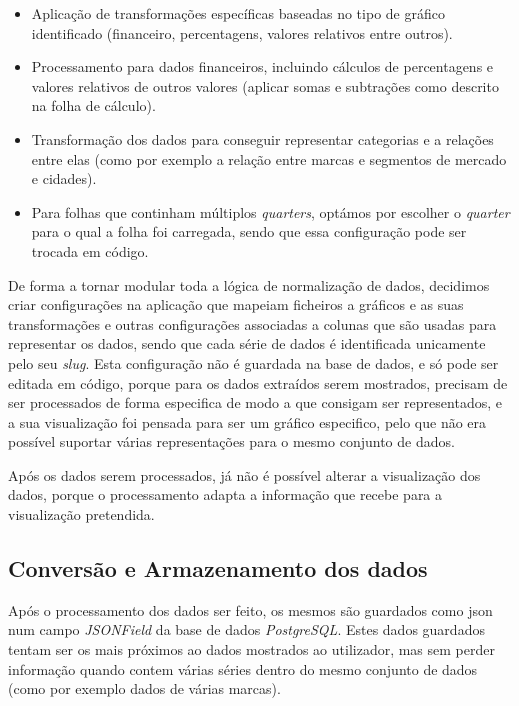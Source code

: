\begin{itemize}
    \item Aplicação de transformações específicas baseadas no tipo de gráfico identificado (financeiro, percentagens, valores relativos entre outros).
    \item Processamento para dados financeiros, incluindo cálculos de percentagens e valores relativos de outros valores (aplicar somas e subtrações como descrito na folha de cálculo).
    \item Transformação dos dados para conseguir representar categorias e a relações entre elas (como por exemplo a relação entre marcas e segmentos de mercado e cidades).
    \item Para folhas que continham múltiplos \textit{quarters}, optámos por escolher o \textit{quarter} para o qual a folha foi carregada, sendo que essa configuração pode ser trocada em código.
\end{itemize}

De forma a tornar modular toda a lógica de normalização de dados, decidimos criar configurações na aplicação que mapeiam ficheiros a gráficos e as suas transformações e outras configurações associadas a colunas que são usadas para representar os dados, sendo que cada série de dados é identificada unicamente pelo seu \textit{slug}. Esta configuração não é guardada na base de dados, e só pode ser editada em código, porque para os dados extraídos serem mostrados, precisam de ser processados de forma especifica de modo a que consigam ser representados, e a sua visualização foi pensada para ser um gráfico especifico, pelo que não era possível suportar várias representações para o mesmo conjunto de dados. 

Após os dados serem processados, já não é possível alterar a visualização dos dados, porque o processamento adapta a informação que recebe para a visualização pretendida.

\subsection{Conversão e Armazenamento dos dados}
\label{sec:armazenamentoDados}

Após o processamento dos dados ser feito, os mesmos são guardados como \gls{json} num campo \textit{JSONField} da base de dados \textit{PostgreSQL}. Estes dados guardados tentam ser os mais próximos ao dados mostrados ao utilizador, mas sem perder informação quando contem várias séries dentro do mesmo conjunto de dados (como por exemplo dados de várias marcas).

